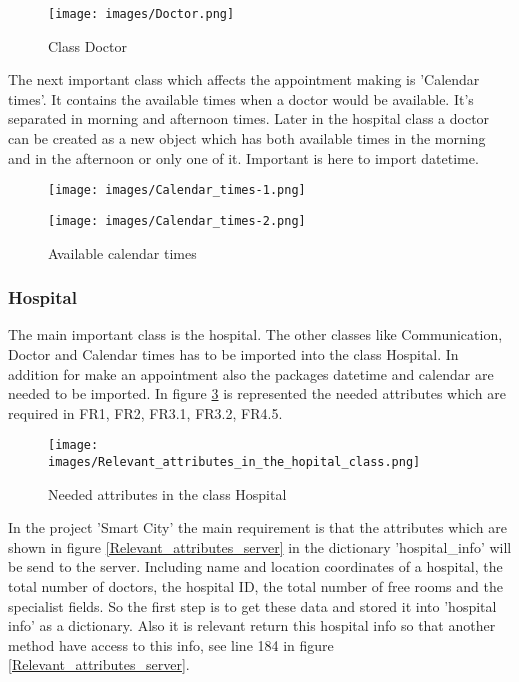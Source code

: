 \begin{figure}[H]
\centering
\sidecaption
\texttt{[image: images/Doctor.png]}
\caption{Class Doctor}
\label{Doctor}
\end{figure}

The next important class which affects the appointment making is 'Calendar times'. It contains the available times when a doctor would be available. It's separated in morning and afternoon times. Later in the hospital class a doctor can be created as a new object which has both available times in the morning and in the afternoon or only one of it. Important is here to import datetime.


\begin{figure}[t]
\begin{minipage}[t]{0.475\textwidth}
\centering
\texttt{[image: images/Calendar\_times-1.png]}
    \caption{Available calendar times}
    \label{Calendar_times}
\end{minipage}
\hfill
\begin{minipage}[t]{0.475\textwidth}
\centering
\texttt{[image: images/Calendar\_times-2.png]}
    \label{2}
\end{minipage}
\end{figure}

\subsubsection{Hospital}
The main important class is the hospital. The other classes like Communication, Doctor and Calendar times has to be imported into the class Hospital. In addition for make an appointment also the packages datetime and calendar are needed to be imported. In figure \ref{hospital_attributes} is represented the needed attributes which are required in FR1, FR2, FR3.1, FR3.2, FR4.5.

\begin{figure}[H]
\centering
\sidecaption
\texttt{[image: images/Relevant\_attributes\_in\_the\_hopital\_class.png]}
\caption{Needed attributes in the class Hospital}
\label{hospital_attributes}
\end{figure}


In the project 'Smart City' the main requirement is that the attributes which are shown in figure \ref{Relevant_attributes_server} in the dictionary 'hospital_info' will be send to the server. Including name and location coordinates of a hospital, the total number of doctors, the hospital ID, the total number of free rooms and the specialist fields. So the first step is to get these data and stored it into 'hospital info' as a dictionary. Also it is relevant return this hospital info so that another method have access to this info, see line 184 in figure \ref{Relevant_attributes_server}. 

